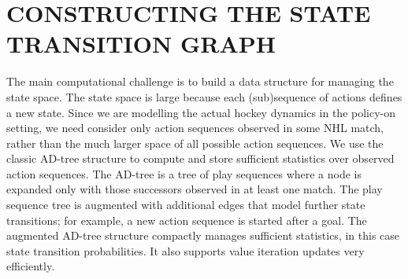 \documentclass[]{article}
\begin{document}
\section{CONSTRUCTING THE STATE TRANSITION GRAPH}
\label{subsec:mdp-construction}

The main computational challenge is to build a data structure for managing the state space. The state space is large because each (sub)sequence of actions defines a new state. Since we are modelling the actual hockey dynamics in the policy-on setting, we need consider only action sequences observed in some NHL match, rather than the much larger space of all possible action sequences. We use the classic AD-tree structure \citep{Moore1998} to compute and store sufficient statistics over observed action sequences.
The AD-tree is a tree of play sequences where a node is expanded only with those successors observed in at least one match.
The play sequence tree is augmented with additional edges that model further state transitions; for example, a new action sequence is started after a goal.
The augmented AD-tree structure compactly manages sufficient statistics, in this case state transition probabilities.
It also supports value iteration updates very efficiently.


\end{document}
